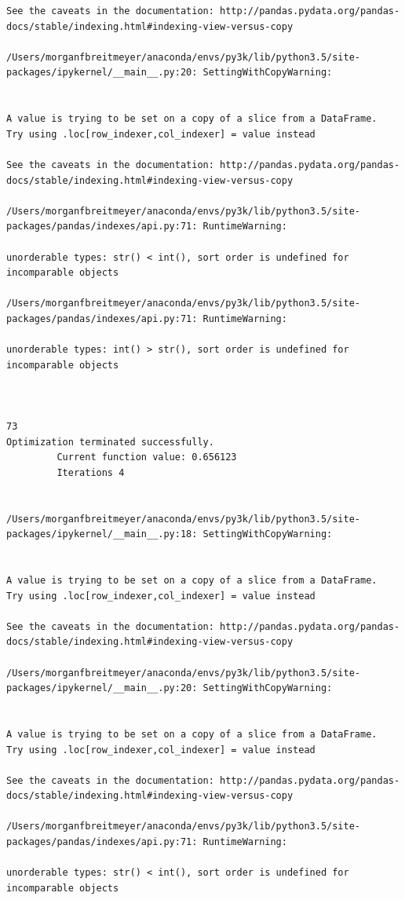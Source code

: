 \begin{lstlisting}
See the caveats in the documentation: http://pandas.pydata.org/pandas-docs/stable/indexing.html#indexing-view-versus-copy

/Users/morganfbreitmeyer/anaconda/envs/py3k/lib/python3.5/site-packages/ipykernel/__main__.py:20: SettingWithCopyWarning:


A value is trying to be set on a copy of a slice from a DataFrame.
Try using .loc[row_indexer,col_indexer] = value instead

See the caveats in the documentation: http://pandas.pydata.org/pandas-docs/stable/indexing.html#indexing-view-versus-copy

/Users/morganfbreitmeyer/anaconda/envs/py3k/lib/python3.5/site-packages/pandas/indexes/api.py:71: RuntimeWarning:

unorderable types: str() < int(), sort order is undefined for incomparable objects

/Users/morganfbreitmeyer/anaconda/envs/py3k/lib/python3.5/site-packages/pandas/indexes/api.py:71: RuntimeWarning:

unorderable types: int() > str(), sort order is undefined for incomparable objects



73
Optimization terminated successfully.
         Current function value: 0.656123
         Iterations 4


/Users/morganfbreitmeyer/anaconda/envs/py3k/lib/python3.5/site-packages/ipykernel/__main__.py:18: SettingWithCopyWarning:


A value is trying to be set on a copy of a slice from a DataFrame.
Try using .loc[row_indexer,col_indexer] = value instead

See the caveats in the documentation: http://pandas.pydata.org/pandas-docs/stable/indexing.html#indexing-view-versus-copy

/Users/morganfbreitmeyer/anaconda/envs/py3k/lib/python3.5/site-packages/ipykernel/__main__.py:20: SettingWithCopyWarning:


A value is trying to be set on a copy of a slice from a DataFrame.
Try using .loc[row_indexer,col_indexer] = value instead

See the caveats in the documentation: http://pandas.pydata.org/pandas-docs/stable/indexing.html#indexing-view-versus-copy

/Users/morganfbreitmeyer/anaconda/envs/py3k/lib/python3.5/site-packages/pandas/indexes/api.py:71: RuntimeWarning:

unorderable types: str() < int(), sort order is undefined for incomparable objects


\end{lstlisting}
